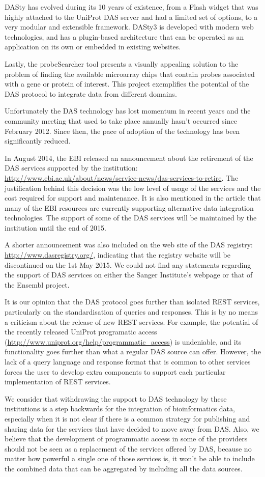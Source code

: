 DASty has evolved during its 10 years of existence, from a Flash widget that was highly attached to the UniProt DAS server and had a limited set of options, to a very modular and extensible framework. DASty3 is developed with modern web technologies, and has a plugin-based architecture that can be operated as an application on its own or embedded in existing websites.

Lastly, the probeSearcher tool presents a visually appealing solution to the problem of finding the available microarray chips that contain probes associated with a gene or protein of interest. This project exemplifies the potential of the DAS protocol to integrate data from different domains.

Unfortunately the DAS technology has lost momentum in recent years and the community meeting that used to take place annually hasn't occurred since February 2012. Since then, the pace of adoption of the technology has been significantly reduced. 

In August 2014, the EBI released an announcement about the retirement of the DAS services supported by the institution: \url{http://www.ebi.ac.uk/about/news/service-news/das-services-to-retire}. The justification behind this decision was the low level of usage of the services and the cost required for support and maintenance. It is also mentioned in the article that many of the EBI resources are currently supporting alternative data integration technologies. The support of some of the DAS services will be maintained by the institution until the end of 2015.

A shorter announcement was also included on the web site of the DAS registry: \url{http://www.dasregistry.org/}, indicating that the registry website will be discontinued on the 1st May 2015. We could not find any statements regarding the support of DAS services  on either the Sanger Institute's webpage or that of the Ensembl project.

It is our opinion that the DAS protocol goes further than isolated REST services, particularly on the standardisation of queries and responses. This is by no means a criticism about the release of new REST services. For example, the potential of the recently released UniProt programatic access (\url{http://www.uniprot.org/help/programmatic_access}) is undeniable, and its functionality goes further than what a regular DAS source can offer. However, the lack of a query language and response format that is common to other services forces the user to develop extra components to support each particular implementation of REST services.

We consider that withdrawing the support to DAS technology by these institutions is a step backwards for the integration of bioinformatics data, especially when it is not clear if there is a common strategy for publishing and sharing data for the services that have decided to move away from DAS. Also, we believe that the development of programmatic access in some of the providers should not be seen as a replacement of the services offered by DAS, because no matter how powerful a single one of those services is, it won't be able to include the combined data that can be aggregated by including all the data sources.
